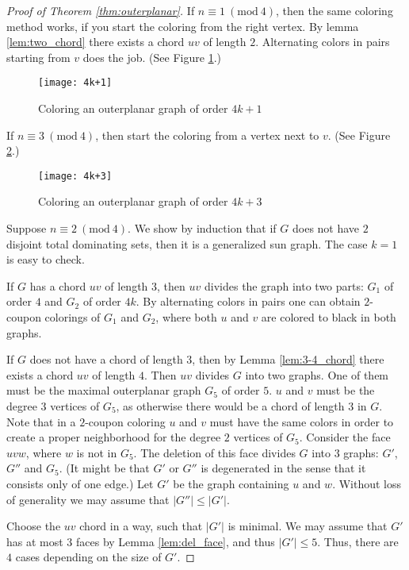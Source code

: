 \begin{proof}[Proof of Theorem \ref{thm:outerplanar}]
  If $n \equiv 1\ (\textrm{mod}\ 4)$, then the same coloring method works, if you
  start the coloring from the right vertex. By lemma \ref{lem:two_chord} there
  exists a chord $uv$ of length $2$. Alternating colors in pairs starting from $v$
  does the job. (See Figure \ref{fig:4k+1}.)
  \begin{figure}[ht]
    \centering
    \texttt{[image: 4k+1]}
    \caption{Coloring an outerplanar graph of order $4k + 1$}
    \label{fig:4k+1}
  \end{figure}

  If $n \equiv 3\ (\textrm{mod}\ 4)$, then start the coloring from a vertex next
  to $v$. (See Figure \ref{fig:4k+3}.)
  \begin{figure}[ht]
    \centering
    \texttt{[image: 4k+3]}
    \caption{Coloring an outerplanar graph of order $4k + 3$}
    \label{fig:4k+3}
  \end{figure}

  Suppose $n \equiv 2\ (\textrm{mod}\ 4)$. We show by induction that if $G$ does not have $2$
  disjoint total dominating sets, then it is a generalized sun graph. The case $k = 1$ is easy to check.

  If $G$ has a chord $uv$ of length $3$, then $uv$ divides the graph into two parts:
  $G_1$ of order $4$ and $G_2$ of order $4k$. By alternating colors in pairs one can obtain
  $2$-coupon colorings of $G_1$ and $G_2$, where both $u$ and $v$ are colored to black
  in both graphs.

  If $G$ does not have a chord of length $3$, then by Lemma \ref{lem:3-4_chord}
  there exists a chord $uv$ of length $4$. Then $uv$ divides $G$ into two graphs.
  One of them must be the maximal outerplanar graph $G_5$ of order $5$. $u$ and $v$
  must be the degree $3$ vertices of $G_5$, as otherwise there would be a chord of length $3$
  in $G$. Note that in a $2$-coupon coloring $u$ and $v$ must have the same colors
  in order to create a proper neighborhood for the degree $2$ vertices of $G_5$.
  Consider the face $uvw$, where $w$ is not in $G_5$. The deletion of this face
  divides $G$ into $3$ graphs: $G'$, $G''$ and $G_5$. (It might be that $G'$ or $G''$ is
  degenerated in the sense that it consists only of one edge.) Let $G'$ be the graph containing
  $u$ and $w$. Without loss of generality we may assume that $|G''| \le |G'|$.

  Choose the $uv$ chord in a way, such that $|G'|$ is minimal. We may assume that
  $G'$ has at most $3$ faces by Lemma \ref{lem:del_face}, and thus $|G'| \le 5$.
  Thus, there are $4$ cases depending on the size of $G'$.


\end{proof}
